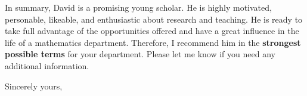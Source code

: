 In summary, David is a promising young scholar.
He is highly motivated, personable, likeable, and enthusiastic 
about  research and  teaching.  
He is ready to take full advantage of the opportunities 
offered and have a great influence in the life of a mathematics department. 
 Therefore, I recommend him in the {\bf strongest possible terms} for your
 department.
Please let me know if you need any additional information.






\closing{Sincerely yours,}

